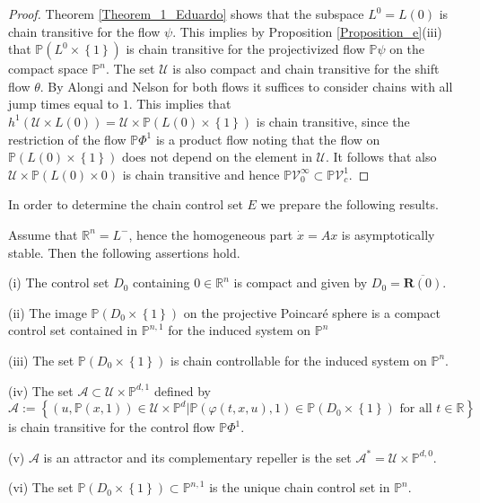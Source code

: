 \documentclass{siamltex}%
\begin{document}
\begin{proof}
Theorem \ref{Theorem_1_Eduardo} shows that the subspace $L^{0}=L(0)$ is chain
transitive for the flow $\psi$. This implies by Proposition
\ref{Proposition_e}(iii) that $\mathbb{P}\left(  L^{0}\times\left\{
1\right\}  \right)  $ is chain transitive for the projectivized flow
$\mathbb{P}\psi$ on the compact space $\mathbb{P}^{n}$. The set $\mathcal{U}$
is also compact and chain transitive for the shift flow $\theta$. By Alongi
and Nelson \cite[Theorem 2.7.18]{AlonN07} for both flows it suffices to
consider chains with all jump times equal to $1$. This implies that
$h^{1}(\mathcal{U}\times L(0))=\mathcal{U}\times\mathbb{P}\left(
L(0)\times\left\{  1\right\}  \right)  $ is chain transitive, since the
restriction of the flow $\mathbb{P}\Phi^{1}$ is a product flow noting that the
flow on $\mathbb{P}\left(  L(0)\times\left\{  1\right\}  \right)  $ does not
depend on the element in $\mathcal{U}$. It follows that also $\mathcal{U}%
\times\mathbb{P}\left(  L(0)\times0\right)  $ is chain transitive and hence
$\mathbb{P}\mathcal{V}_{0}^{\infty}\subset\mathbb{P}\mathcal{V}_{c}^{1}$.
\end{proof}

In order to determine the chain control set $E$ we prepare the following results.

\begin{proposition}
\label{PropositionL-}Assume that $\mathbb{R}^{n}=L^{-}$, hence the homogeneous
part $\dot{x}=Ax$ is asymptotically stable. Then the following assertions hold.

(i) The control set $D_{0}$ containing \thinspace$0\in\mathbb{R}^{n}$ is
compact and given by $D_{0}=\overline{\mathbf{R}(0)}$.

(ii) The image $\mathbb{P}(D_{0}\times\left\{  1\right\}  )$ on the projective
Poincar\'{e} sphere is a compact control set contained in $\mathbb{P}^{n,1}$
for the induced system on $\mathbb{P}^{n}$

(iii) The set $\mathbb{P}\left(  D_{0}\times\left\{  1\right\}  \right)  $ is
chain controllable for the induced system on $\mathbb{P}^{n}$.

(iv) The set $\mathcal{A}\subset\mathcal{U}\times\mathbb{P}^{d,1}$ defined by%
\begin{equation}
\mathcal{A}:=\left\{  (u,\mathbb{P}(x,1))\in\mathcal{U}\times\mathbb{P}%
^{d}\left\vert \mathbb{P}(\varphi(t,x,u),1)\in\mathbb{P}(D_{0}\times\left\{
1\right\}  )\text{ for all }t\in\mathbb{R}\right.  \right\}  \label{lift2}%
\end{equation}
is chain transitive for the control flow $\mathbb{P}\Phi^{1}$.

(v) $\mathcal{A}$ is an attractor and its complementary repeller is the set
$\mathcal{A}^{\ast}=\mathcal{U}\times\mathbb{P}^{d,0}$.

(vi) The set $\mathbb{P}(D_{0}\times\left\{  1\right\}  )\subset
\mathbb{P}^{n,1}$ is the unique chain control set in $\mathbb{P}^{n}$.
\end{proposition}
\end{document}
